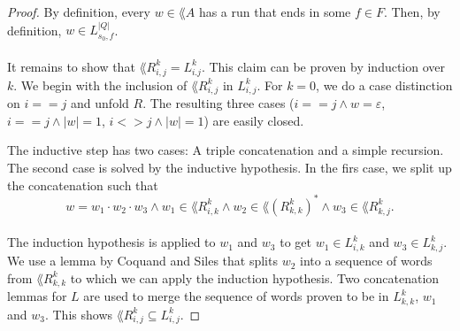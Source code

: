                                     \begin{proof}
                                        By definition, every $w \in \lang{A}$ has a run that ends in some $f \in F$. 
                                        Then, by definition, $w \in  L^{|Q|}_{s_0, f}$. 

                                        \paragraph{}
                                        It remains to show that $\lang{R^k_{i,j}} = L^k_{i.j}$. 
                                        This claim can be proven by induction over $k$. 
                                        We begin with the inclusion of $\lang{R^k_{i,j}}$ in $L^k_{i,j}$. 
                                        For $k=0$, we do a case distinction on $i==j$ and unfold $R$. 
                                        The resulting three cases ($i==j \wedge w=\varepsilon$, $i==j \wedge |w|=1$, $i<>j \wedge |w|=1$) are easily closed. 

                                        The inductive step has two cases: A triple concatenation and a simple recursion. 
                                        The second case is solved by the inductive hypothesis.
                                        In the firs case, we split up the concatenation such that
                                        \begin{equation*}
                                            w = w_1 \cdot w_2 \cdot w_3 
                                            \wedge w_1 \in \lang{R^k_{i,k}} 
                                            \wedge w_2 \in \lang{(R^k_{k,k})^*} 
                                            \wedge w_3 \in \lang{R^k_{k,j}}.                               
                                        \end{equation*}
                                        \paragraph{}
                                        The induction hypothesis is applied to $w_1$ and $w_3$ to get $w_1 \in L^k_{i,k}$ and $w_3 \in L^k_{k,j}$.
                                        We use a lemma by Coquand and Siles that splits $w_2$ into a sequence of words from $\lang{R^k_{k,k}}$ to which we can apply the induction hypothesis. 
                                        Two concatenation lemmas for $L$ are used to merge the sequence of words proven to be in $L^k_{k,k}$,
                                        $w_1$ and $w_3$. This shows $\lang{R^k_{i,j}} \subseteq L^k_{i,j}$.


\end{proof}
